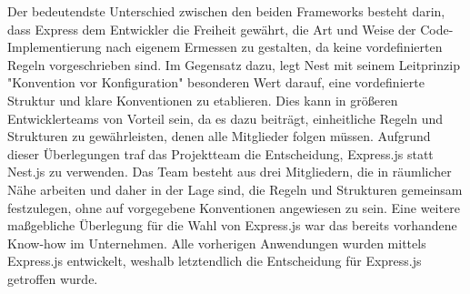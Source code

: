 Der bedeutendste Unterschied zwischen den beiden Frameworks besteht darin, dass Express dem Entwickler die Freiheit gewährt, die Art und Weise der Code-Implementierung nach eigenem Ermessen zu gestalten, da keine vordefinierten Regeln vorgeschrieben sind. Im Gegensatz dazu, legt Nest mit seinem Leitprinzip "Konvention vor Konfiguration" besonderen Wert darauf, eine vordefinierte Struktur und klare Konventionen zu etablieren. Dies kann in größeren Entwicklerteams von Vorteil sein, da es dazu beiträgt, einheitliche Regeln und Strukturen zu gewährleisten, denen alle Mitglieder folgen müssen.
\newline
Aufgrund dieser Überlegungen traf das Projektteam die Entscheidung, Express.js statt Nest.js zu verwenden. Das Team besteht aus drei Mitgliedern, die in räumlicher Nähe arbeiten und daher in der Lage sind, die Regeln und Strukturen gemeinsam festzulegen, ohne auf vorgegebene Konventionen angewiesen zu sein. Eine weitere maßgebliche Überlegung für die Wahl von Express.js war das bereits vorhandene Know-how im Unternehmen. Alle vorherigen Anwendungen wurden mittels Express.js entwickelt, weshalb letztendlich die Entscheidung für Express.js getroffen wurde.
\cite{express_js_vs_nest_js}